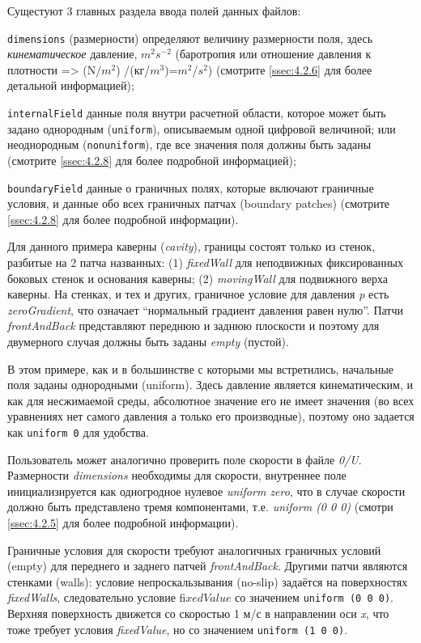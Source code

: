 Сущестуют 3 главных раздела ввода полей данных файлов:

\texttt{dimensions} (размерности) определяют величину размерности поля, здесь \textit{кинематическое}
 давление, $m^2 s^{−2}$ (баротропия или отношение давления к плотности => (N/$m^2$) /(кг/$m^3$)=$m^2$/$s^2$)
 (смотрите \autoref{ssec:4.2.6} для более детальной информацией);

\texttt{internalField} данные поля внутри расчетной области, которое может быть задано однородным (\texttt{uniform}),
 описываемым одной цифровой величиной; или неоднородным (\texttt{nonuniform}), где все значения поля должны быть заданы
 (смотрите \autoref{ssec:4.2.8} для более подробной информацией);

\texttt{boundaryField} данные о граничных полях, которые включают граничные условия, и данные обо всех граничных
 патчах (boundary patches) (смотрите \autoref{ssec:4.2.8} для более подробной информации).

Для данного примера каверны (\textsl{cavity}), границы состоят только из стенок, разбитые на 2 патча
 названных: (1) \textsl{fixedWall} для неподвижных фиксированных боковых стенок и основания каверны; (2) \textsl{movingWall}
для подвижного верха каверны. На стенках, и тех и других, граничное условие для давления \textsl{p} есть \textsl{zeroGradient},
 что означает “нормальный градиент давления равен нулю”. Патчи \textsl{frontAndBack} представляют переднюю и заднюю
 плоскости и поэтому для двумерного случая должны быть заданы \textsl{empty} (пустой).

В этом примере, как и в большинстве с которыми мы встретились, начальные поля заданы однородными (uniform).
 Здесь давление является кинематическим, и как для несжимаемой среды, абсолютное значение
 его не имеет значения (во всех уравнениях нет самого давления а только его производные), поэтому оно
 задается как \texttt{uniform 0} для удобства.

Пользователь может аналогично проверить поле скорости в файле \textsl{0/U}. Размерности \textsl{dimensions}
 необходимы для скорости, внутреннее поле инициализируется как одногродное нулевое \textsl{uniform zero},
 что в случае скорости должно быть представлено тремя компонентами, т.е. \textsl{uniform (0 0 0)} (смотри
 \autoref{ssec:4.2.5} для более подробной информации).

Граничные условия для скорости требуют аналогичных граничных условий (empty) для переднего
 и заднего патчей \textsl{frontAndBack}. Другими патчи являются стенками (walls): условие
 непроскальзывания (no-slip) задаётся на поверхностях \textsl{fixedWalls}, следовательно
 условие \textsl{$ﬁxedValue$} со значением \texttt{uniform (0 0 0)}. Верхняя поверхность движется
 со скоростью 1 м/с в направлении оси \textit{x}, что тоже требует условия \textsl{ﬁxedValue}, но со значением 
\texttt{uniform (1 0 0)}.


